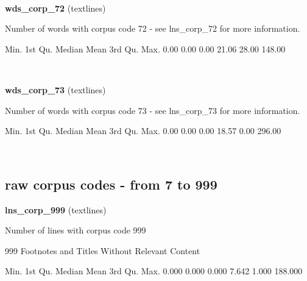 \documentclass[]{article}
\newenvironment{Shaded}{\begin{snugshade}}{\end{snugshade}}
\newcommand{\FloatTok}[1]{\textcolor[rgb]{0.00,0.00,0.81}{{#1}}}
\newcommand{\NormalTok}[1]{{#1}}
\begin{document}
~

\vspace{1em}

\textbf{wds\_corp\_72} (textlines)

Number of words with corpus code 72 - see lns\_corp\_72 for more
information.

\begin{Shaded}
\begin{Highlighting}[]
   \NormalTok{Min. 1st Qu.  Median    Mean 3rd Qu.    Max. }
   \FloatTok{0.00}    \FloatTok{0.00}    \FloatTok{0.00}   \FloatTok{21.06}   \FloatTok{28.00}  \FloatTok{148.00} 
\end{Highlighting}
\end{Shaded}

~

\vspace{1em}

\textbf{wds\_corp\_73} (textlines)

Number of words with corpus code 73 - see lns\_corp\_73 for more
information.

\begin{Shaded}
\begin{Highlighting}[]
   \NormalTok{Min. 1st Qu.  Median    Mean 3rd Qu.    Max. }
   \FloatTok{0.00}    \FloatTok{0.00}    \FloatTok{0.00}   \FloatTok{18.57}    \FloatTok{0.00}  \FloatTok{296.00} 
\end{Highlighting}
\end{Shaded}

~

\vspace{1em}

\subsection{raw corpus codes - from 7 to
999}\label{raw-corpus-codes---from-7-to-999}

\textbf{lns\_corp\_999} (textlines)

Number of lines with corpus code 999

999 Footnotes and Titles Without Relevant Content

\begin{Shaded}
\begin{Highlighting}[]
   \NormalTok{Min. 1st Qu.  Median    Mean 3rd Qu.    Max. }
  \FloatTok{0.000}   \FloatTok{0.000}   \FloatTok{0.000}   \FloatTok{7.642}   \FloatTok{1.000} \FloatTok{188.000} 
\end{Highlighting}
\end{Shaded}
\end{document}
